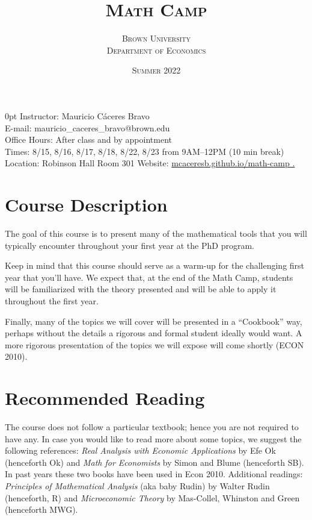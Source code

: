 \documentclass[11pt]{article}
\title{\bfseries\scshape Math Camp}
\author{\scshape Brown University \\ \scshape Department of Economics}
\date{\scshape Summer 2022}
\renewcommand{\displayoptions}{\maketitle\pagenumbering{arabic}}
\begin{document}
\displayoptions

{
  \bfseries
  \begin{adjustwidth}{\parindent}{0pt}
    Instructor: Mauricio C\'aceres Bravo \\
    E-mail: mauricio\_caceres\_bravo@brown.edu \\
    Office Hours: After class and by appointment \\[12pt]
    Times: 8/15, 8/16, 8/17, 8/18, 8/22, 8/23 from 9AM--12PM (10 min break) \\
    Location: Robinson Hall Room 301
    Website: \href{https://mcaceresb.github.io/tablefill}{mcaceresb.github.io/math-camp \ExternalLink.}
  \end{adjustwidth}
  \vspace{12pt}
}

\section{Course Description}
\label{sec:course_description}

The goal of this course is to present many of the mathematical tools that you will typically encounter throughout your first year at the PhD program.

Keep in mind that this course should serve as a warm-up for the challenging first year that you’ll have. We expect that, at the end of the Math Camp, students will be familiarized with the theory presented and will be able to apply it throughout the first year.

Finally, many of the topics we will cover will be presented in a ``Cookbook'' way, perhaps without the details a rigorous and formal student ideally would want. A more rigorous presentation of the topics we will expose will come shortly (ECON 2010).

\section{Recommended Reading}
\label{sec:recommended_reading}

The course does not follow a particular textbook; hence you are not required to have any. In case you would like to read more about some topics, we suggest the following references: \textit{Real Analysis with Economic Applications} by Efe Ok (henceforth Ok) and \textit{Math for Economists} by Simon and Blume (henceforth SB). In past years these two books have been used in Econ 2010. Additional readings: \textit{Principles of Mathematical Analysis} (aka baby Rudin) by Walter Rudin (henceforth, R) and \textit{Microeconomic Theory} by Mas-Collel, Whinston and Green (henceforth MWG).
\end{document}
